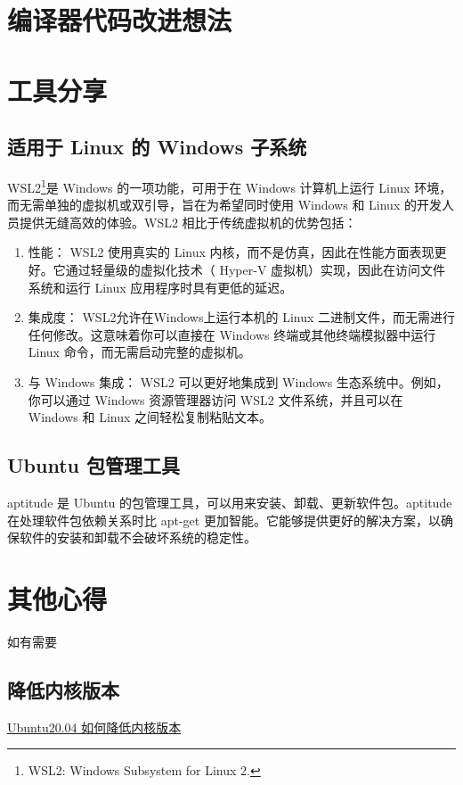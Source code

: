 \documentclass{article}
\begin{document}
\section{编译器代码改进想法}

\section{工具分享}

\subsection{适用于 Linux 的 Windows 子系统}

WSL2\footnote{WSL2: Windows Subsystem for Linux 2.}是 Windows 的一项功能，可用于在 Windows 计算机上运行 Linux 环境，而无需单独的虚拟机或双引导，旨在为希望同时使用 Windows 和 Linux 的开发人员提供无缝高效的体验。WSL2 相比于传统虚拟机的优势包括：
\begin{enumerate}
    \item 性能： WSL2 使用真实的 Linux 内核，而不是仿真，因此在性能方面表现更好。它通过轻量级的虚拟化技术（ Hyper-V 虚拟机）实现，因此在访问文件系统和运行 Linux 应用程序时具有更低的延迟。
    \item 集成度： WSL2允许在Windows上运行本机的 Linux 二进制文件，而无需进行任何修改。这意味着你可以直接在 Windows 终端或其他终端模拟器中运行 Linux 命令，而无需启动完整的虚拟机。
    \item 与 Windows 集成： WSL2 可以更好地集成到 Windows 生态系统中。例如，你可以通过 Windows 资源管理器访问 WSL2 文件系统，并且可以在 Windows 和 Linux 之间轻松复制粘贴文本。
\end{enumerate}

\subsection{Ubuntu 包管理工具}
aptitude 是 Ubuntu 的包管理工具，可以用来安装、卸载、更新软件包。aptitude 在处理软件包依赖关系时比 apt-get 更加智能。它能够提供更好的解决方案，以确保软件的安装和卸载不会破坏系统的稳定性。

\section{其他心得}
如有需要

\subsection{降低内核版本}
\href{https://blog.csdn.net/qq_49814035/article/details/116035670}{Ubuntu20.04 如何降低内核版本}
\end{document}
